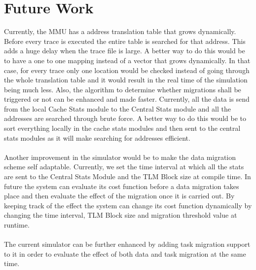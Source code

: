 \documentclass{listhesis}
\begin{document}
\section{Future Work}
Currently, the MMU has a address translation table that grows dynamically. Before every trace is executed the entire table is searched for that address. This adds a huge delay when the trace file is large. A better way to do this would be to have a one to one mapping instead of a vector that grows dynamically. In that case, for every trace only one location would be checked instead of going through the whole translation table and it would result in the real time of the simulation being much less. Also, the algorithm to determine whether migrations shall be triggered or not can be enhanced and made faster. Currently, all the data is send from the local Cache Stats module to the Central Stats module and all the addresses are searched through brute force. A better way to do this would be to sort everything locally in the cache stats modules and then sent to the central stats modules as it will make searching for addresses efficient.\\
\\
Another improvement in the simulator would be to make the data migration scheme self adaptable. Currently, we set the time interval at which all the stats are sent to the Central Stats Module and the TLM Block size at compile time. In future the system can evaluate its cost function before a data migration takes place and then evaluate the effect of the migration once it is carried out. By keeping track of the effect the system can change its cost function dynamically by changing the time interval, TLM Block size and migration threshold value at runtime.\\
\\
The current simulator can be further enhanced by adding task migration support to it in order to evaluate the effect of both data and task migration at the same time.
\cleardoublepage



\confirmation
\end{document}
